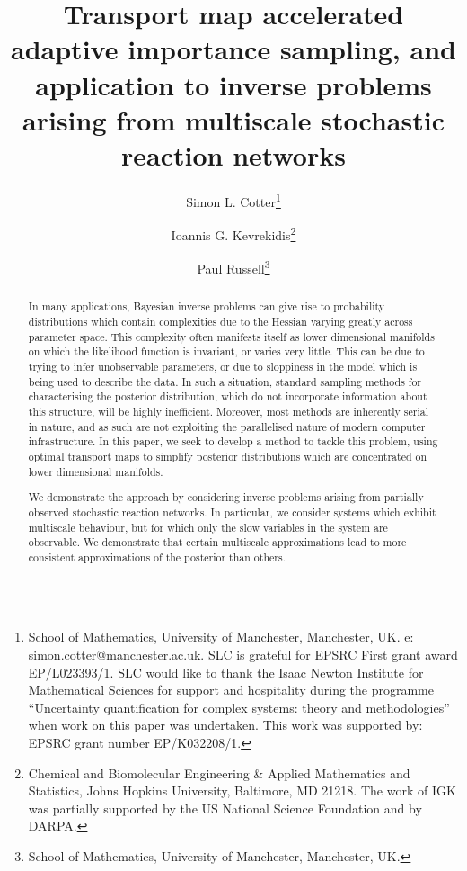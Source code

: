 \documentclass[final]{siamltex}
\author{Simon L. Cotter\thanks{School of
    Mathematics, University of Manchester, Manchester, UK. e:
    simon.cotter@manchester.ac.uk. SLC is grateful for EPSRC First
    grant award EP/L023393/1. SLC would like to thank the Isaac Newton
    Institute for Mathematical Sciences for support and hospitality
    during the programme ``Uncertainty quantification for complex systems: theory and methodologies'' when work on this paper was undertaken. This work was supported by:
EPSRC grant number EP/K032208/1.} \and Ioannis
G. Kevrekidis\thanks{Chemical and Biomolecular Engineering \& Applied
  Mathematics and Statistics, Johns Hopkins University, Baltimore, MD
  21218. The work of IGK was partially supported by the US National Science Foundation and by DARPA.} \and Paul
  Russell\thanks{School of
    Mathematics, University of Manchester, Manchester, UK.}}
\title{Transport map accelerated adaptive importance sampling, and application to inverse problems arising from
  multiscale stochastic reaction networks}
\begin{document}
\maketitle
\begin{abstract}
In many applications, Bayesian inverse problems can give rise to
probability distributions which contain complexities due to the
Hessian varying greatly across parameter space. This complexity often manifests itself as lower
dimensional manifolds on which the likelihood function is
invariant, or varies very little. This can be due to trying to infer
unobservable parameters, or due to sloppiness in the model which is
being used to describe the data. In such a situation, standard
sampling methods for characterising the posterior distribution, which
do not incorporate information about this structure, will be highly
inefficient. Moreover, most methods are inherently serial in nature,
and as such are not exploiting the parallelised  nature of modern
computer infrastructure. In this paper, we seek to develop a method to
tackle this problem, using optimal transport maps to simplify
posterior distributions which are concentrated on lower dimensional
manifolds.

We demonstrate the approach by considering inverse problems arising
from partially observed stochastic reaction networks. In particular,
we consider systems which exhibit multiscale behaviour, but for which
only the slow variables in the system are observable. We demonstrate
that certain multiscale approximations lead to more consistent
approximations of the posterior than others.
\end{abstract}
\end{document}
